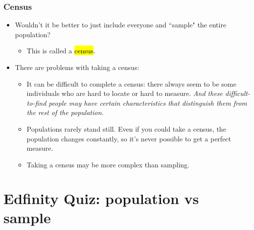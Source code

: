 \documentclass[11pt,containsverbatim,handout]{beamer}
\begin{document}
\begin{frame}
	\frametitle{Census}

	\begin{itemize}

	\item Wouldn't it be better to just include everyone and ``sample" the entire population? 

	\begin{itemize}
	\item This is called a \hl{census}.
	\end{itemize}

	\pause

	\item There are problems with taking a census:

	\begin{itemize}
	\item It can be difficult to complete a census: there always seem to be some individuals who are hard to locate or hard to measure. \textit{And these difficult-to-find people may have certain characteristics that distinguish them from the rest of the population.}
	\item Populations rarely stand still. Even if you could take a census, the population changes constantly, so it's never possible to get a perfect measure.
	\item Taking a census may be more complex than sampling.
	\end{itemize}

	\end{itemize}

\end{frame}

\section{Edfinity Quiz: population vs sample}
\end{document}
